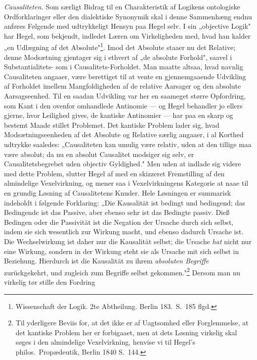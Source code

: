 \documentclass[12pt]{book}
\newcommand{\opage}[1]{\marginnote{\footnotesize\textit{[#1]}}}
\begin{document}
\emph{Causaliteten.} Som særligt Bidrag til en Charakteristik af Logikens ontologiske
Ordforklaringer eller den dialektiske Synonymik skal i denne Sammenhæng endnu anføres
Følgende med udtrykkeligt Hensyn paa Hegel selv. I sin „objective Logik" har Hegel, som
bekjendt, indledet Læren om Virkeligheden med, hvad han kalder „en Udlægning af det
Absolute"\footnote{Wissenschaft der Logik. 2te Abtheilung. Berlin 183.\ S.~185 flgd.
}. Imod det Absolute staaer nu det Relative; denne Modsætning gjentager sig i ethvert af
„de absolute Forhold", saavel i Substantialitets- som i Causalitets-Forholdet. Man maatte
altsaa, hvad navnlig Causaliteten angaaer, være berettiget til at vente en gjennemgaaende
Udvikling af Forholdet imellem Mangfoldigheden af de relative Aarsager og den absolute
\opage{138} Aarsagseenhed. Til en saadan Udvikling var her en saameget større Opfordring, som Kant i
den ovenfor omhandlede Antinomie --- og Hegel behandler jo ellers gjerne, hvor Leilighed
gives, de kantiske Antinomier --- har paa en skarp og bestemt Maade stillet Problemet. Det
kantiske Problem lader sig, hvad Modsætningseenheden af det Absolute og Relative særlig
angaaer, i al Korthed udtrykke saaledes: „Causaliteten kan umulig være relativ, uden at
den tillige maa være absolut; da nu en absolut Causalitet modsiger sig selv, er
Causalitetsbegrebet uden objectiv Gyldighed." Men uden at indlade sig videre med dette
Problem, slutter Hegel af med en skizzeret Fremstilling af den almindelige Vexelvirkning,
og mener saa i Vexelvirkningens Kategorie at naae til en grundig Løsning af Causalitetens
Knuder. Hele Løsningen er summarisk indeholdt i følgende Forklaring: „Die Kausalität ist
bedingt und bedingend; das Bedingende ist das Passive, aber ebenso sehr ist das Bedingte
passiv. Dieß Bedingen oder die Passivität ist die Negation der Ursache durch sich selbst,
indem sie sich wesentlich zur Wirkung macht, und ebenso dadurch Ursache ist. Die
Wechselwirkung ist daher nur die Kausalität selbst; die Ursache \emph{hat} nicht nur eine
Wirkung, sondern in der Wirkung steht sie als Ursache mit sich selbst in Beziehung.
Hierdurch ist die Kausalität zu ihrem \emph{absoluten Begriffe} zurückgekehrt, und
zugleich zum Begriffe selbst gekommen."\footnote{Til yderligere Beviis for, at det ikke er
af Uagtsomhed eller Forglemmelse, at det kantiske Problem her er forbigaaet, men at dets
Løsning virkelig skal søges i den almindelige Vexelvirkning, henvise vi til Hegel's
philos.\ Propædeutik, Berlin 1840 S.~144.} Dersom man nu virkelig tør stille den Fordring
\end{document}
